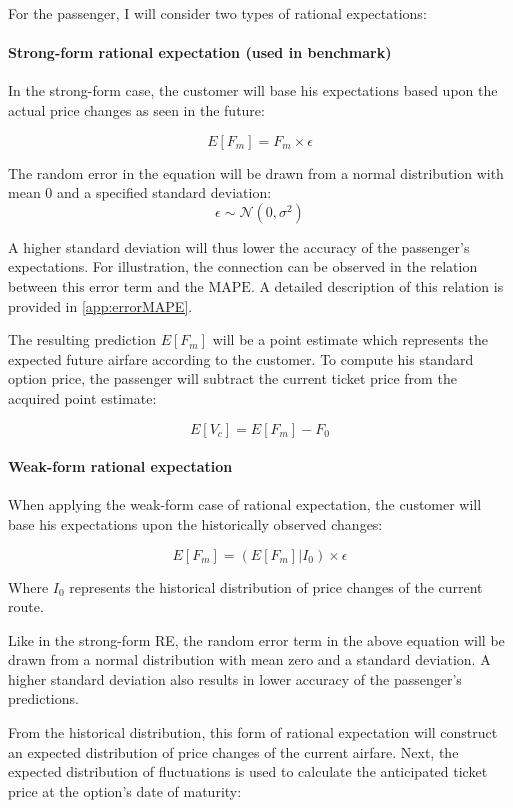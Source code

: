 For the passenger, I will consider two types of rational expectations:

\paragraph{Strong-form rational expectation (used in benchmark)}
In the strong-form case, the customer will base his expectations based upon the actual price changes as seen in the future:

$$ E[F_m] = F_m \times \epsilon$$

The random error in the equation will be drawn from a normal distribution with mean 0 and a specified standard deviation:
$$ \epsilon \sim \mathcal{N} (0, \sigma^2) $$

A higher standard deviation will thus lower the accuracy of the passenger's expectations. For illustration, the connection can be observed in the relation between this error term and the $\mbox{MAPE}$. A detailed description of this relation is provided in \autoref{app:errorMAPE}.

The resulting prediction $E[F_m]$ will be a point estimate which represents the expected future airfare according to the customer. To compute his standard option price, the passenger will subtract the current ticket price from the acquired point estimate:

$$ E[V_c] = E[F_m] - F_0$$


\paragraph{Weak-form rational expectation}
When applying the weak-form case of rational expectation, the customer will base his expectations upon the historically observed changes:

$$ E[F_m] = (E[F_m] | I_0) \times \epsilon $$

Where $I_0$ represents the historical distribution of price changes of the current route.

Like in the strong-form RE, the random error term in the above equation will be drawn from a normal distribution with mean zero and a standard deviation. A higher standard deviation also results in lower accuracy of the passenger's predictions.

From the historical distribution, this form of rational expectation will construct an expected distribution of price changes of the current airfare. Next, the expected distribution of fluctuations is used to calculate the anticipated ticket price at the option's date of maturity:

